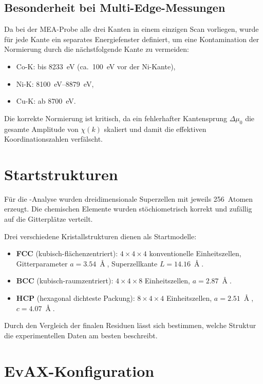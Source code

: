 \subsection{Besonderheit bei Multi-Edge-Messungen}

Da bei der MEA-Probe alle drei Kanten in einem einzigen Scan vorliegen,
wurde für jede Kante ein separates Energiefenster definiert, um eine
Kontamination der Normierung durch die nächstfolgende Kante zu
vermeiden:
\begin{itemize}[nosep]
  \item Co-K: bis \SI{8233}{\electronvolt} (ca.\ \SI{100}{\electronvolt}
        vor der Ni-Kante),
  \item Ni-K: \SIrange{8100}{8879}{\electronvolt},
  \item Cu-K: ab \SI{8700}{\electronvolt}.
\end{itemize}
Die korrekte Normierung ist kritisch, da ein fehlerhafter Kantensprung
$\Delta\mu_0$ die gesamte Amplitude von $\chi(k)$ skaliert und damit
die effektiven Koordinationszahlen verfälscht.

\section{Startstrukturen}

Für die \evax{}-Analyse wurden dreidimensionale Superzellen mit
jeweils 256~Atomen erzeugt.
Die chemischen Elemente wurden stöchiometrisch korrekt und zufällig
auf die Gitterplätze verteilt.

Drei verschiedene Kristallstrukturen dienen als Startmodelle:
\begin{itemize}[nosep]
  \item \textbf{FCC} (kubisch-flächenzentriert): $4\times4\times4$
        konventionelle Einheitszellen, Gitterparameter
        $a = \SI{3.54}{\Angstrom}$, Superzellkante
        $L = \SI{14.16}{\Angstrom}$.
  \item \textbf{BCC} (kubisch-raumzentriert): $4\times4\times8$
        Einheitszellen, $a = \SI{2.87}{\Angstrom}$.
  \item \textbf{HCP} (hexagonal dichteste Packung):
        $8\times4\times4$ Einheitszellen,
        $a = \SI{2.51}{\Angstrom}$, $c = \SI{4.07}{\Angstrom}$.
\end{itemize}
Durch den Vergleich der finalen Residuen lässt sich bestimmen, welche
Struktur die experimentellen Daten am besten beschreibt.

\section{EvAX-Konfiguration}


